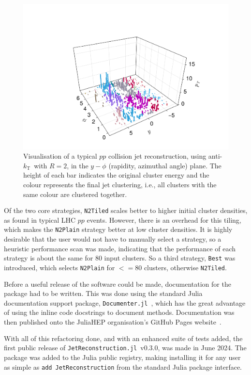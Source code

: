 \documentclass{webofc}
\newcommand{\akt}{anti-${k}_\text{T}$}
\newcommand{\JR}{\texttt{JetReconstruction.jl}}
\begin{document}
\begin{figure}[h]
    \begin{center}
        \includegraphics[width=0.6\linewidth]{jetvis-5-compact.pdf}
        \caption{Visualisation of a typical $pp$ collision jet reconstruction, using \akt\ with $R=2$, in the $y-\phi$ (rapidity, azimuthal angle) plane. The height of each bar indicates the original cluster energy and the colour represents the final jet clustering, i.e., all clusters with the same colour are clustered together.}
        \label{fig:jetvisplot}
    \end{center}
\end{figure}

Of the two core strategies, \texttt{N2Tiled} scales better to higher
initial cluster densities, as found in typical LHC $pp$ events. However, there
is an overhead for this tiling, which makes the \texttt{N2Plain} strategy better
at low cluster densities. It is highly desirable that the user would not have to
manually select a strategy, so a heuristic performance scan was made, indicating
that the performance of each strategy is about the same for 80 input clusters.
So a third strategy, \texttt{Best} was introduced, which selects
\texttt{N2Plain} for $<=80$ clusters, otherwise \texttt{N2Tiled}.

Before a useful release of the software could be made, documentation for the
package had to be written. This was done using the standard Julia documentation
support package, \texttt{Documenter.jl}~\cite{documenter-jl}, which has the
great advantage of using the inline code docstrings to document methods.
Documentation was then published onto the JuliaHEP organisation's GitHub Pages
website~\cite{jetreco-docs}.

With all of this refactoring done, and with an enhanced suite of tests added,
the first public release of \JR\, v0.3.0, was made in June 2024. The package was
added to the Julia public registry, making installing it for any user as simple
as \texttt{add JetReconstruction} from the standard Julia package interface.
\end{document}
